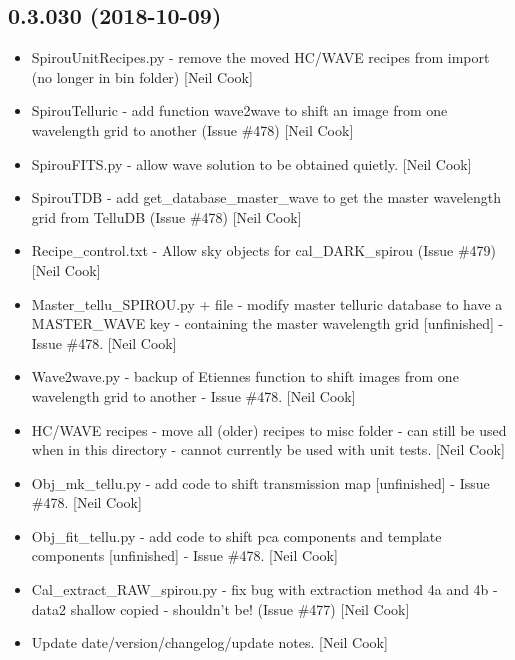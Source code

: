 \documentclass[a4paper,10pt,english]{report}
\begin{document}
\subsection{0.3.030 (2018-10-09)}
\label{\detokenize{misc/changelog:id299}}\begin{itemize}
\item {} 
SpirouUnitRecipes.py - remove the moved HC/WAVE recipes from import
(no longer in bin folder) {[}Neil Cook{]}

\item {} 
SpirouTelluric - add function wave2wave to shift an image from one
wavelength grid to another (Issue \#478) {[}Neil Cook{]}

\item {} 
SpirouFITS.py - allow wave solution to be obtained quietly. {[}Neil
Cook{]}

\item {} 
SpirouTDB - add get\_database\_master\_wave to get the master wavelength
grid from TelluDB (Issue \#478) {[}Neil Cook{]}

\item {} 
Recipe\_control.txt - Allow sky objects for cal\_DARK\_spirou (Issue
\#479) {[}Neil Cook{]}

\item {} 
Master\_tellu\_SPIROU.py + file - modify master telluric database to
have a MASTER\_WAVE key - containing the master wavelength grid
{[}unfinished{]} - Issue \#478. {[}Neil Cook{]}

\item {} 
Wave2wave.py - backup of Etiennes function to shift images from one
wavelength grid to another - Issue \#478. {[}Neil Cook{]}

\item {} 
HC/WAVE recipes - move all (older) recipes to misc folder - can still
be used when in this directory - cannot currently be used with unit
tests. {[}Neil Cook{]}

\item {} 
Obj\_mk\_tellu.py - add code to shift transmission map {[}unfinished{]} -
Issue \#478. {[}Neil Cook{]}

\item {} 
Obj\_fit\_tellu.py - add code to shift pca components and template
components {[}unfinished{]} - Issue \#478. {[}Neil Cook{]}

\item {} 
Cal\_extract\_RAW\_spirou.py - fix bug with extraction method 4a and 4b -
data2 shallow copied - shouldn’t be! (Issue \#477) {[}Neil Cook{]}

\item {} 
Update date/version/changelog/update notes. {[}Neil Cook{]}

\end{itemize}
\end{document}
